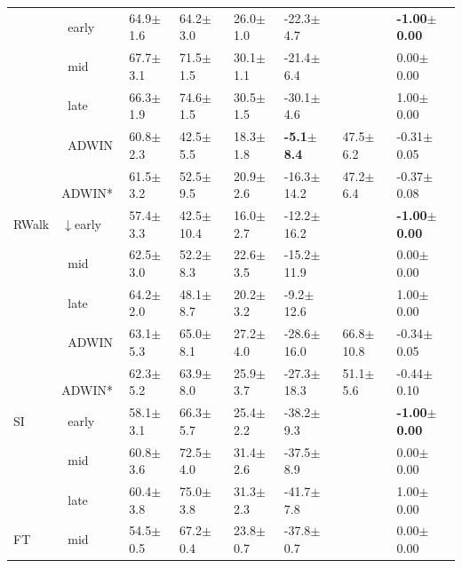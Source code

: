 \begin{tabular}{llllllll}
 & $\ \;$early & 64.9\tiny{$\pm$1.6} & 64.2\tiny{$\pm$3.0} & 26.0\tiny{$\pm$1.0} & -22.3\tiny{$\pm$4.7} &  & \textbf{-1.00\tiny{$\pm$0.00}} \\
 & $\ \;$mid & 67.7\tiny{$\pm$3.1} & 71.5\tiny{$\pm$1.5} & 30.1\tiny{$\pm$1.1} & -21.4\tiny{$\pm$6.4} &  & 0.00\tiny{$\pm$0.00} \\
 & $\ \;$late & 66.3\tiny{$\pm$1.9} & 74.6\tiny{$\pm$1.5} & 30.5\tiny{$\pm$1.5} & -30.1\tiny{$\pm$4.6} &  & 1.00\tiny{$\pm$0.00} \\
\midrule
\multirow[t]{5}{*}{RWalk} & $\ \;$ADWIN & 60.8\tiny{$\pm$2.3} & 42.5\tiny{$\pm$5.5} & 18.3\tiny{$\pm$1.8} & \textbf{-5.1\tiny{$\pm$8.4}} & 47.5\tiny{$\pm$6.2} & -0.31\tiny{$\pm$0.05} \\
 & $\ \;$ADWIN* & 61.5\tiny{$\pm$3.2} & 52.5\tiny{$\pm$9.5} & 20.9\tiny{$\pm$2.6} & -16.3\tiny{$\pm$14.2} & 47.2\tiny{$\pm$6.4} & -0.37\tiny{$\pm$0.08} \\
 & $\downarrow$early & 57.4\tiny{$\pm$3.3} & 42.5\tiny{$\pm$10.4} & 16.0\tiny{$\pm$2.7} & -12.2\tiny{$\pm$16.2} &  & \textbf{-1.00\tiny{$\pm$0.00}} \\
 & $\ \;$mid & 62.5\tiny{$\pm$3.0} & 52.2\tiny{$\pm$8.3} & 22.6\tiny{$\pm$3.5} & -15.2\tiny{$\pm$11.9} &  & 0.00\tiny{$\pm$0.00} \\
 & $\ \;$late & 64.2\tiny{$\pm$2.0} & 48.1\tiny{$\pm$8.7} & 20.2\tiny{$\pm$3.2} & -9.2\tiny{$\pm$12.6} &  & 1.00\tiny{$\pm$0.00} \\
\midrule
\multirow[t]{5}{*}{SI} & $\ \;$ADWIN & 63.1\tiny{$\pm$5.3} & 65.0\tiny{$\pm$8.1} & 27.2\tiny{$\pm$4.0} & -28.6\tiny{$\pm$16.0} & 66.8\tiny{$\pm$10.8} & -0.34\tiny{$\pm$0.05} \\
 & $\ \;$ADWIN* & 62.3\tiny{$\pm$5.2} & 63.9\tiny{$\pm$8.0} & 25.9\tiny{$\pm$3.7} & -27.3\tiny{$\pm$18.3} & 51.1\tiny{$\pm$5.6} & -0.44\tiny{$\pm$0.10} \\
 & $\ \;$early & 58.1\tiny{$\pm$3.1} & 66.3\tiny{$\pm$5.7} & 25.4\tiny{$\pm$2.2} & -38.2\tiny{$\pm$9.3} &  & \textbf{-1.00\tiny{$\pm$0.00}} \\
 & $\ \;$mid & 60.8\tiny{$\pm$3.6} & 72.5\tiny{$\pm$4.0} & 31.4\tiny{$\pm$2.6} & -37.5\tiny{$\pm$8.9} &  & 0.00\tiny{$\pm$0.00} \\
 & $\ \;$late & 60.4\tiny{$\pm$3.8} & 75.0\tiny{$\pm$3.8} & 31.3\tiny{$\pm$2.3} & -41.7\tiny{$\pm$7.8} &  & 1.00\tiny{$\pm$0.00} \\
\midrule
FT & $\ \;$mid & 54.5\tiny{$\pm$0.5} & 67.2\tiny{$\pm$0.4} & 23.8\tiny{$\pm$0.7} & -37.8\tiny{$\pm$0.7} &  & 0.00\tiny{$\pm$0.00} \\
\bottomrule
\end{tabular}
